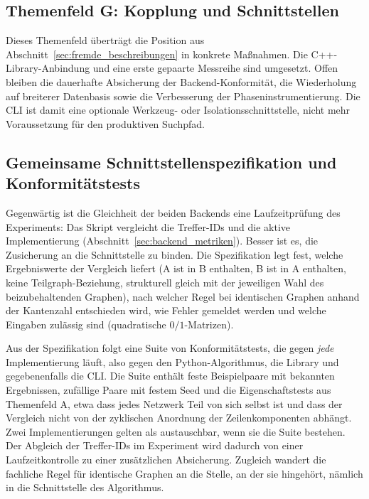 \documentclass[a4paper,12pt, twoside]{report}
\theoremstyle{definition}
\begin{document}
\subsection*{Themenfeld G: Kopplung und Schnittstellen}

Dieses Themenfeld überträgt die Position aus Abschnitt~\ref{sec:fremde_beschreibungen} in konkrete Maßnahmen. Die C++-Library-Anbindung und eine erste gepaarte Messreihe sind umgesetzt. Offen bleiben die dauerhafte Absicherung der Backend-Konformität, die Wiederholung auf breiterer Datenbasis sowie die Verbesserung der Phaseninstrumentierung. Die CLI ist damit eine optionale Werkzeug- oder Isolationsschnittstelle, nicht mehr Voraussetzung für den produktiven Suchpfad.

\subsection{Gemeinsame Schnittstellenspezifikation und Konformitätstests}
\label{sec:konformitaet}

Gegenwärtig ist die Gleichheit der beiden Backends eine Laufzeitprüfung des Experiments: Das Skript vergleicht die Treffer-IDs und die aktive Implementierung (Abschnitt~\ref{sec:backend_metriken}). Besser ist es, die Zusicherung an die Schnittstelle zu binden. Die Spezifikation legt fest, welche Ergebniswerte der Vergleich liefert (A ist in B enthalten, B ist in A enthalten, keine Teilgraph-Beziehung, strukturell gleich mit der jeweiligen Wahl des beizubehaltenden Graphen), nach welcher Regel bei identischen Graphen anhand der Kantenzahl entschieden wird, wie Fehler gemeldet werden und welche Eingaben zulässig sind (quadratische $0/1$-Matrizen).

Aus der Spezifikation folgt eine Suite von Konformitätstests, die gegen \emph{jede} Implementierung läuft, also gegen den Python-Algorithmus, die Library und gegebenenfalls die CLI. Die Suite enthält feste Beispielpaare mit bekannten Ergebnissen, zufällige Paare mit festem Seed und die Eigenschaftstests aus Themenfeld A, etwa dass jedes Netzwerk Teil von sich selbst ist und dass der Vergleich nicht von der zyklischen Anordnung der Zeilenkomponenten abhängt. Zwei Implementierungen gelten als austauschbar, wenn sie die Suite bestehen. Der Abgleich der Treffer-IDs im Experiment wird dadurch von einer Laufzeitkontrolle zu einer zusätzlichen Absicherung. Zugleich wandert die fachliche Regel für identische Graphen an die Stelle, an der sie hingehört, nämlich in die Schnittstelle des Algorithmus.
\end{document}
